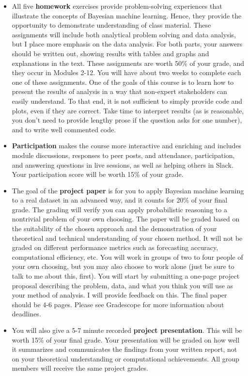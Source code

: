 \documentclass[11pt]{article}
\begin{document}
\begin{description}
\begin{itemize}
\item All five {\bf homework} exercises provide problem-solving experiences that illustrate the concepts of Bayesian machine learning. Hence, they provide the opportunity to demonstrate understanding of class material. These assignments will include both analytical problem solving and data analysis, but I place more emphasis on the data analysis. For both parts, your answers should be written out, showing results with tables and graphs and explanations in the text. These assignments are worth 50\% of your grade, and they occur in Modules 2-12. You will have about two weeks to complete each one of these assignments. One of the goals of this course is to learn how to present the results of analysis in a way that non-expert stakeholders can easily understand. To that end, it is not sufficient to simply provide code and plots, even if they are correct. Take time to interpret results (as is reasonable, you don’t need to provide lengthy prose if the question asks for one number), and to write well commented code.
\item {\bf Participation} makes the course more interactive and enriching and includes module discussions, responses to peer posts, and attendance, participation, and answering questions in live sessions, as well as helping others in Slack. Your participation score will be worth 15\% of your grade. 
\item The goal of the {\bf project paper} is for you to apply Bayesian machine learning to a real dataset in an advanced way, and it counts for 20\% of your final grade. The grading will verify you can apply probabilistic reasoning to a nontrivial problem of your own choosing. The paper will be graded based on the suitability of the chosen approach and the demonstration of your theoretical and technical understanding of your chosen method. It will not be graded on different performance metrics such as forecasting accuracy, computational efficiency, etc. You will work in groups of two to four people of your own choosing, but you may also choose to work alone (just be sure to talk to me about this, first). You will start by submitting a one-page project proposal describing the problem, data, and what you think you will use as your method of analysis. I will provide feedback on this. The final paper should be 4-6 pages. Please see Gradescope for more information about deadlines. 
\item You will also give a 5-7 minute recorded {\bf project presentation}. This will be worth 15\% of your final grade. Your presentation
will be graded on how well it summarizes and communicates the findings from your written report, not on your theoretical understanding or computational achievements. All group members will receive the same project grades.
\end{itemize}  


\end{description}
\end{document}
